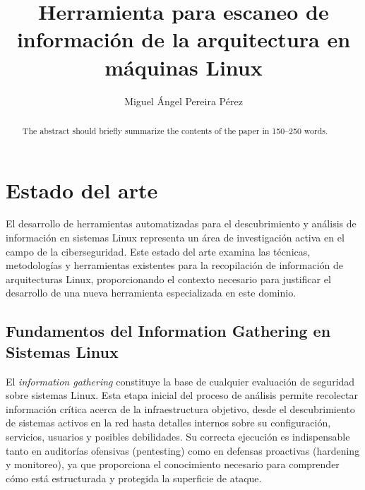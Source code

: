 \documentclass[runningheads]{llncs}
\begin{document}
\pagestyle{empty}

%
\title{Herramienta para escaneo de información de la arquitectura en máquinas Linux}
%
%
\author{Miguel Ángel Pereira Pérez}
%

%
%
\maketitle              %
%
\begin{abstract}
The abstract should briefly summarize the contents of the paper in
150--250 words.

\end{abstract}
%
%


\section{Estado del arte}
El desarrollo de herramientas automatizadas para el descubrimiento y análisis de información en sistemas Linux representa un área de investigación activa en el campo de la ciberseguridad. Este estado del arte examina las técnicas, metodologías y herramientas existentes para la recopilación de información de arquitecturas Linux, proporcionando el contexto necesario para justificar el desarrollo de una nueva herramienta especializada en este dominio.

\subsection{Fundamentos del Information Gathering en Sistemas Linux}

El \textit{information gathering} constituye la base de cualquier evaluación de seguridad sobre sistemas Linux. Esta etapa inicial del proceso de análisis permite recolectar información crítica acerca de la infraestructura objetivo, desde el descubrimiento de sistemas activos en la red hasta detalles internos sobre su configuración, servicios, usuarios y posibles debilidades. Su correcta ejecución es indispensable tanto en auditorías ofensivas (pentesting) como en defensas proactivas (hardening y monitoreo), ya que proporciona el conocimiento necesario para comprender cómo está estructurada y protegida la superficie de ataque.
\end{document}
